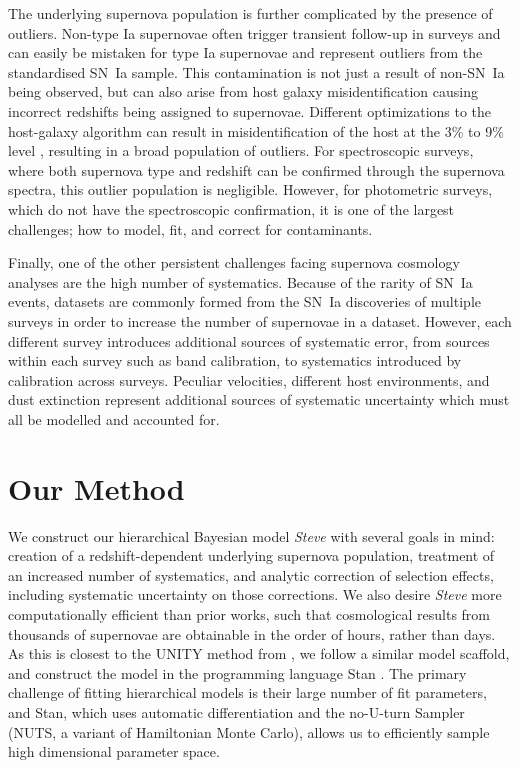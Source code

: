 \documentclass[a4paper,fleqn,usenatbib]{emulateapj}
\newcommand{\steve}{\textit{Steve}}
\newcommand{\rubin}{\citetalias{Rubin2015}}
\begin{document}
The underlying supernova population is further complicated by the presence of outliers. Non-type Ia supernovae often trigger transient follow-up in surveys and can easily be mistaken for type Ia supernovae  and represent outliers from the standardised SN~Ia sample. This contamination is not just a result of non-SN~Ia being observed, but can also arise from host galaxy misidentification causing incorrect redshifts  being assigned to supernovae. Different optimizations to the host-galaxy algorithm can result in misidentification of the host at the 3\% to 9\% level \citep{Gupta2016}, resulting in a broad population of outliers. For spectroscopic surveys, where both supernova type and redshift can be confirmed through the supernova spectra, this outlier population is negligible. However, for photometric surveys, which do not have the spectroscopic confirmation, it is one of the largest challenges; how to model, fit, and correct for contaminants.

Finally, one of the other persistent challenges facing supernova cosmology analyses are the high number of systematics. Because of the rarity of SN~Ia events, datasets are commonly formed from the SN~Ia discoveries of multiple surveys in order to increase the number of supernovae in a dataset. However, each different survey introduces additional sources of systematic error, from sources within each survey such as band calibration, to systematics introduced by calibration across surveys. Peculiar velocities, different host environments, and dust extinction represent additional sources of systematic uncertainty which must all be modelled and accounted for. 



\section{Our Method}
\label{sec:method}

We construct our hierarchical Bayesian model {\steve} with several goals in mind: creation of a redshift-dependent underlying supernova population,  treatment of an increased number of systematics, and analytic correction of selection effects, including systematic uncertainty on those corrections. We also desire {\steve} more computationally efficient than prior works, such that cosmological results from thousands of supernovae are obtainable in the order of hours, rather than days. As this is closest to the UNITY method from \citet[][hereafter denoted \rubin]{Rubin2015}, we follow a similar model scaffold, and construct the model in the programming language Stan \citep{Carpenter2017, StanDevelopmentTeam2017}. The primary challenge of fitting hierarchical models is their large number of fit parameters, and Stan, which uses automatic differentiation and the no-U-turn Sampler (NUTS, a variant of Hamiltonian Monte Carlo), allows us to efficiently sample high dimensional parameter space.
\end{document}

